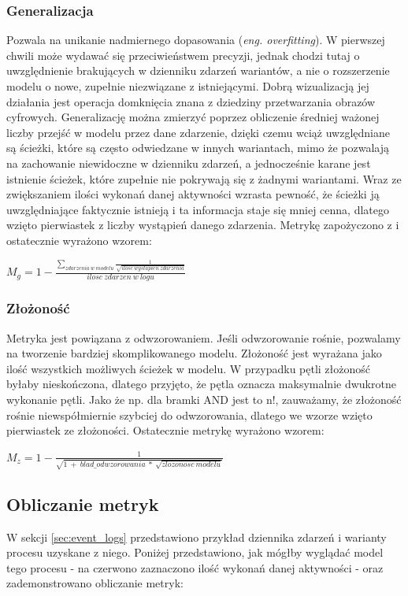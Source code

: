 \subsubsection{Generalizacja}
Pozwala na unikanie nadmiernego dopasowania (\textit{eng. overfitting}). W pierwszej chwili może wydawać się przeciwieństwem precyzji, jednak chodzi tutaj o uwzględnienie brakujących w dzienniku zdarzeń wariantów, a nie o rozszerzenie modelu o nowe, zupełnie niezwiązane z istniejącymi. Dobrą wizualizacją jej działania jest operacja domknięcia znana z dziedziny przetwarzania obrazów cyfrowych. Generalizację można zmierzyć poprzez obliczenie średniej ważonej liczby przejść w modelu przez dane zdarzenie, dzięki czemu wciąż uwzględniane są ścieżki, które są często odwiedzane w innych wariantach, mimo że pozwalają na zachowanie niewidoczne w dzienniku zdarzeń, a jednocześnie karane jest istnienie ścieżek, które zupełnie nie pokrywają się z żadnymi wariantami. Wraz ze zwiększaniem ilości wykonań danej aktywności wzrasta pewność, że ścieżki ją uwzględniające faktycznie istnieją i ta informacja staje się mniej cenna, dlatego wzięto pierwiastek z liczby wystąpień danego zdarzenia. Metrykę zapożyczono z \cite{qd-in-discovery} i ostatecznie wyrażono wzorem:
\begin{center}
$M_g = 1 - \frac{\sum_{zdarzenia\ w\ modelu} \frac{1}{\sqrt{ilosc\ wystapien\ zdarzenia}}}{ilosc\ zdarzen\ w\ logu} $
\end{center}
\subsubsection{Złożoność}
Metryka jest powiązana z odwzorowaniem. Jeśli odwzorowanie rośnie, pozwalamy na tworzenie bardziej skomplikowanego modelu. Złożoność jest wyrażana jako ilość wszystkich możliwych ścieżek w modelu. W przypadku pętli złożoność byłaby nieskończona, dlatego przyjęto, że pętla oznacza maksymalnie dwukrotne wykonanie pętli. Jako że np. dla bramki AND jest to n!, zauważamy, że złożoność rośnie niewspółmiernie szybciej do odwzorowania, dlatego we wzorze wzięto pierwiastek ze złożoności. Ostatecznie metrykę wyrażono wzorem: 
\begin{center}
$M_z = 1 - \frac{1}{\sqrt{1\ +\ blad\_odwzorowania\ *\ \sqrt{zlozonosc\ modelu}}} $
\end{center}
\subsection{Obliczanie metryk}
W sekcji \ref{sec:event_logs} przedstawiono przykład dziennika zdarzeń i warianty procesu uzyskane z niego. Poniżej przedstawiono, jak mógłby wyglądać model tego procesu - na czerwono zaznaczono ilość wykonań danej aktywności - oraz zademonstrowano obliczanie metryk:

